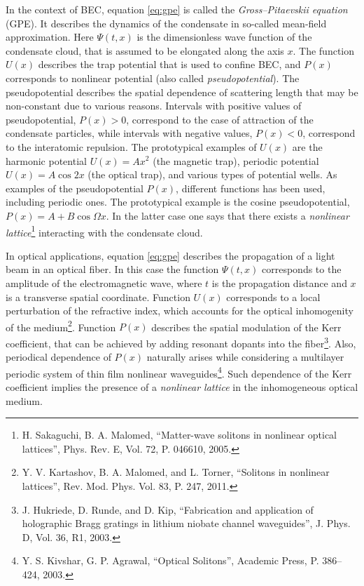 \documentclass[candidate, href, colorlinks]{disser}
\begin{document}
In the context of BEC, equation \eqref{eq:gpe} is called the {\it Gross--Pitaevskii equation} (GPE).
It describes the dynamics of the condensate in so-called mean-field approximation.
Here $\Psi(t, x)$ is the dimensionless wave function of the condensate cloud, that is assumed to be elongated along the axis $x$.
The function $U(x)$ describes the trap potential that is used to confine BEC, and $P(x)$ corresponds to nonlinear potential (also called {\it pseudopotential}).
The pseudopotential describes the spatial dependence of scattering length that may be non-constant due to various reasons.
Intervals with positive values of pseudopotential, $P(x) > 0$, correspond to the case of attraction of the condensate particles, while intervals with negative values, $P(x) < 0$, correspond to the interatomic repulsion.
The prototypical examples of $U(x)$ are the harmonic potential $U(x) = Ax^2$ (the magnetic trap), periodic potential $U(x) = A \cos 2x$ (the optical trap), and various types of potential wells.
As examples of the pseudopotential $P(x)$, different functions has been used, including periodic ones.
The prototypical example is the cosine pseudopotential, $P(x) = A + B \cos \Omega x$.
In the latter case one says that there exists a {\it nonlinear lattice}\footnote{\label{note:malomed} H. Sakaguchi,  B. A. Malomed, ``Matter-wave solitons in nonlinear optical lattices'', Phys. Rev. E, Vol. 72, P. 046610, 2005.} interacting with the condensate cloud.

In optical applications, equation \eqref{eq:gpe} describes the propagation of a light beam in an optical fiber.
In this case the function $\Psi(t, x)$ corresponds to the amplitude of the electromagnetic wave, where $t$ is the propagation distance and $x$ is a transverse spatial coordinate.
Function $U(x)$ corresponds to a local perturbation of the refractive index, which accounts for the optical inhomogenity of the medium\footnote{\label{note:torner} Y. V. Kartashov, B. A. Malomed, and L. Torner, ``Solitons in nonlinear lattices'', Rev. Mod. Phys. Vol. 83, P. 247, 2011.}.
Function $P(x)$ describes the spatial modulation of the Kerr coefficient, that can be achieved by adding resonant dopants into the fiber\footnote{J. Hukriede, D. Runde, and D. Kip, ``Fabrication and application of holographic Bragg gratings in lithium niobate channel waveguides'', J. Phys. D, Vol. 36, R1, 2003.}.
Also, periodical dependence of $P(x)$ naturally arises while considering a multilayer periodic system of thin film nonlinear waveguides\footnote{Y. S. Kivshar, G. P. Agrawal, ``Optical Solitons'', Academic Press, P. 386--424, 2003.}.
Such dependence of the Kerr coefficient implies the presence of a {\it nonlinear lattice} in the inhomogeneous optical medium.
\end{document}

